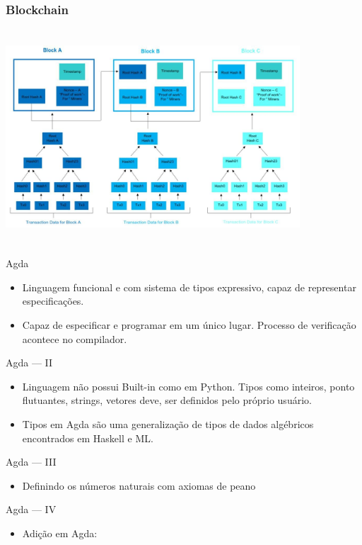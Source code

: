 \documentclass{beamer}
\begin{document}
\begin{frame}
\frametitle{Blockchain}
\includegraphics[width=11cm, height=8cm]{blockchain3}
\end{frame}
 
 \begin{frame}{Agda}
 \begin{itemize}
     \item Linguagem funcional e com sistema de tipos expressivo, capaz de representar especificações.
     \item Capaz de especificar e programar em um único lugar. Processo de verificação acontece no compilador.
 \end{itemize}
 \end{frame}
 
 \begin{frame}{Agda --- II}
 \begin{itemize}
     \item Linguagem não possui Built-in como em Python. Tipos como inteiros, ponto flutuantes, strings, vetores deve, ser definidos pelo próprio usuário.
     \item Tipos em Agda são uma generalização de tipos de dados algébricos encontrados em Haskell e ML.
 \end{itemize}
 \end{frame}
 
 \begin{frame}{Agda --- III}
\begin{itemize}
	\item Definindo os números naturais com axiomas de peano
 \end{itemize}
\end{frame}

       \begin{frame}{Agda --- IV}
         \begin{itemize}
           \item Adição em Agda:
         \end{itemize}
\end{frame}
\end{document}

